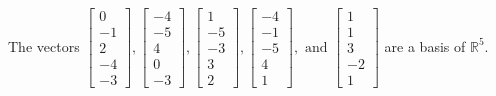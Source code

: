 \begin{exercise}
\begin{exerciseStatement}
  \end{exerciseStatement}
  \begin{exerciseAnswer}
   The vectors \(\left[\begin{array}{r}
0 \\
-1 \\
2 \\
-4 \\
-3
\end{array}\right] , \left[\begin{array}{r}
-4 \\
-5 \\
4 \\
0 \\
-3
\end{array}\right] , \left[\begin{array}{r}
1 \\
-5 \\
-3 \\
3 \\
2
\end{array}\right] , \left[\begin{array}{r}
-4 \\
-1 \\
-5 \\
4 \\
1
\end{array}\right] , \text{ and } \left[\begin{array}{r}
1 \\
1 \\
3 \\
-2 \\
1
\end{array}\right]\) 
  	 are  a basis of \(\mathbb{R}^5\).
  


  \end{exerciseAnswer}
\end{exercise}